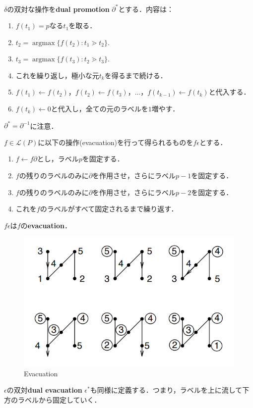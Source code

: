 \documentclass[xelatex,ja=standard,a4paper,14pt,everyparhook=compat]{bxjsarticle}
\newcommand{\mcL}{\mathcal{L}}
\theoremstyle{definition}
\begin{document}
$\delta$の双対な操作を\textbf{dual promotion} $\partial^*$とする．内容は：
\begin{enumerate}[1.]
    \item $f(t_1) = p$なる$t_1$を取る．
    \item $t_2 = \operatorname{argmax} \{f(t_2) : t_1 \gtrdot t_2\}$.
    \item $t_3 = \operatorname{argmax} \{f(t_3) : t_2 \gtrdot t_3\}$.
    \item これを繰り返し，極小な元$t_k$を得るまで続ける．
    \item $f(t_1) \gets f(t_2)$，$f(t_2) \gets f(t_3)$，...，$f(t_{k-1}) \gets f(t_k)$と代入する．
    \item $f(t_k) \gets 0$と代入し，全ての元のラベルを$1$増やす．
\end{enumerate}

$\partial^* = \partial^{-1}$に注意．

\newpage

$f \in \mcL(P)$に以下の操作(evacuation)を行って得られるものを$f\epsilon$とする．
\begin{enumerate}[1.]
    \item $f \gets f\partial$とし，ラベル$p$を固定する．
    \item $f$の残りのラベルのみに$\partial$を作用させ，さらにラベル$p-1$を固定する．
    \item $f$の残りのラベルのみに$\partial$を作用させ，さらにラベル$p-2$を固定する．
    \item これを$f$のラベルがすべて固定されるまで繰り返す．
\end{enumerate}

$f\epsilon$は$f$の\textbf{evacuation}．

\begin{figure}[ht]
    \centering
    \includegraphics[width=.7\textwidth]{3.37.png}
    \caption{Evacuation}
\end{figure}

$\epsilon$の双対\textbf{dual evacuation} $\epsilon^*$も同様に定義する．つまり，ラベルを上に流して下方のラベルから固定していく．
\end{document}

